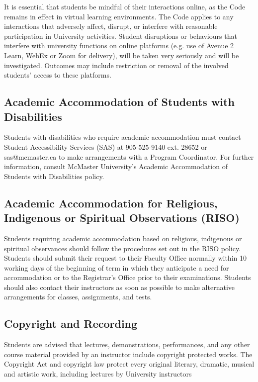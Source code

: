\documentclass[12pt]{article}
\begin{document}
It is essential that students be mindful of their interactions online, as the
Code remains in effect in virtual learning environments. The Code applies to any
interactions that adversely affect, disrupt, or interfere with reasonable
participation in University activities. Student disruptions or behaviours that
interfere with university functions on online platforms (e.g. use of Avenue 2
Learn, WebEx or Zoom for delivery), will be taken very seriously and will be
investigated. Outcomes may include restriction or removal of the involved
students’ access to these platforms.

\subsection*{Academic Accommodation of Students with Disabilities}

Students with disabilities who require academic accommodation must contact
Student Accessibility Services (SAS) at 905-525-9140 ext. 28652 or
sas@mcmaster.ca to make arrangements with a Program Coordinator. For further
information, consult McMaster University’s Academic Accommodation of Students
with Disabilities policy. 

\subsection*{Academic Accommodation for Religious, Indigenous or Spiritual
  Observations (RISO)}

Students requiring academic accommodation based on religious, indigenous or
spiritual observances should follow the procedures set out in the RISO
policy. Students should submit their request to their Faculty Office normally
within 10 working days of the beginning of term in which they anticipate a need
for accommodation or to the Registrar's Office prior to their
examinations. Students should also contact their instructors as soon as possible
to make alternative arrangements for classes, assignments, and tests.

\subsection*{Copyright and Recording}

Students are advised that lectures, demonstrations, performances, and any other
course material provided by an instructor include copyright protected works. The
Copyright Act and copyright law protect every original literary, dramatic,
musical and artistic work, including lectures by University instructors
\end{document}
